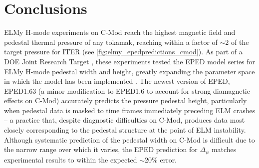 \section{Conclusions}\label{sec:elmy_conclusion}

ELMy H-mode experiments on C-Mod reach the highest magnetic field and pedestal thermal pressure of any tokamak, reaching within a factor of $\sim 2$ of the target pressure for ITER (see \cref{fig:elmy_epedpredictions_cmod}).  As part of a DOE Joint Research Target \cite{Groebner2013}, these experiments tested the EPED model series \cite{Snyder2009} for ELMy H-mode pedestal width and height, greatly expanding the parameter space in which the model has been implemented \cite{Walk2012}.  The newest version of EPED, EPED1.63 (a minor modification to EPED1.6 to account for strong diamagnetic effects on C-Mod) accurately predicts the pressure pedestal height, particularly when pedestal data is masked to time frames immediately preceding ELM crashes -- a practice that, despite diagnostic difficulties on C-Mod, produces data most closely corresponding to the pedestal structure at the point of ELM instability.  Although systematic prediction of the pedestal width on C-Mod is difficult due to the narrow range over which it varies, the EPED prediction for $\Delta_\psi$ matches experimental results to within the expected $\sim 20\%$ error.  

\begin{figure}[t]
 \pushtooutside
\end{figure}


